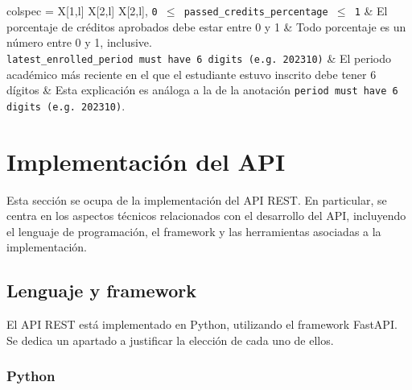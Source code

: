 \begin{longtblr}[
		caption = {Anotaciones del diagrama de clases y su significado},
		label = {tab:anotaciones},
	]{
		colspec = {X[1,l] X[2,l] X[2,l]},
	}
	\texttt{0 \ensuremath{\leq} passed\_credits\_percentage \ensuremath{\leq} 1} & El porcentaje de créditos aprobados debe estar entre 0 y 1                                                                 & Todo porcentaje es un número entre 0 y 1, inclusive.                                                                                                                                                                                                               \\
	\texttt{latest\_enrolled\_period must have 6 digits (e.g. 202310)}           & El periodo académico más reciente en el que el estudiante estuvo inscrito debe tener 6 dígitos                             & Esta explicación es análoga a la de la anotación \texttt{period must have 6 digits (e.g. 202310)}.                                                                                                                                                                 \\
	\hline
\end{longtblr}

\section{Implementación del API}

Esta sección se ocupa de la implementación del \gls{API REST}. En particular, se centra en los aspectos técnicos relacionados con el desarrollo del \gls{API}, incluyendo el lenguaje de programación, el framework y las herramientas asociadas a la implementación.

\subsection{Lenguaje y framework}

El \gls{API REST} está implementado en \gls{Python}, utilizando el framework \gls{FastAPI}. Se dedica un apartado a justificar la elección de cada uno de ellos.

\subsubsection{Python}

